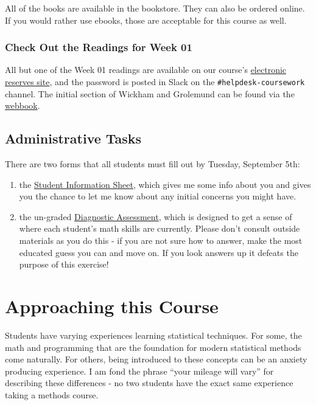 \documentclass[]{book}
\theoremstyle{definition}
\theoremstyle{definition}
\theoremstyle{definition}
\theoremstyle{remark}
\begin{document}
All of the books are available in the bookstore. They can also be
ordered online. If you would rather use ebooks, those are acceptable for
this course as well.

\subsection{Check Out the Readings for Week
01}\label{check-out-the-readings-for-week-01}

All but one of the Week 01 readings are available on our course's
\href{http://eres.slu.edu/eres/coursepass.aspx?cid=4487}{electronic
reserves site}, and the password is posted in Slack on the
\texttt{\#helpdesk-coursework} channel. The initial section of Wickham
and Grolemund can be found via the
\href{http://r4ds.had.co.nz}{webbook}.

\section{Administrative Tasks}\label{administrative-tasks}

There are two forms that all students must fill out by Tuesday,
September 5th:

\begin{enumerate}
\def\labelenumi{\arabic{enumi}.}
\item
  the \href{https://goo.gl/forms/HddqLWd00qz6Qs903}{Student Information
  Sheet}, which gives me some info about you and gives you the chance to
  let me know about any initial concerns you might have.
\item
  the un-graded \href{https://goo.gl/forms/EgVGaUWu8mys2yBr2}{Diagnostic
  Assessment}, which is designed to get a sense of where each student's
  math skills are currently. Please don't consult outside materials as
  you do this - if you are not sure how to answer, make the most
  educated guess you can and move on. If you look answers up it defeats
  the purpose of this exercise!
\end{enumerate}

\chapter{Approaching this Course}\label{approaching-this-course}

Students have varying experiences learning statistical techniques. For
some, the math and programming that are the foundation for modern
statistical methods come naturally. For others, being introduced to
these concepts can be an anxiety producing experience. I am fond the
phrase ``your mileage will vary'' for describing these differences - no
two students have the exact same experience taking a methods course.
\end{document}
